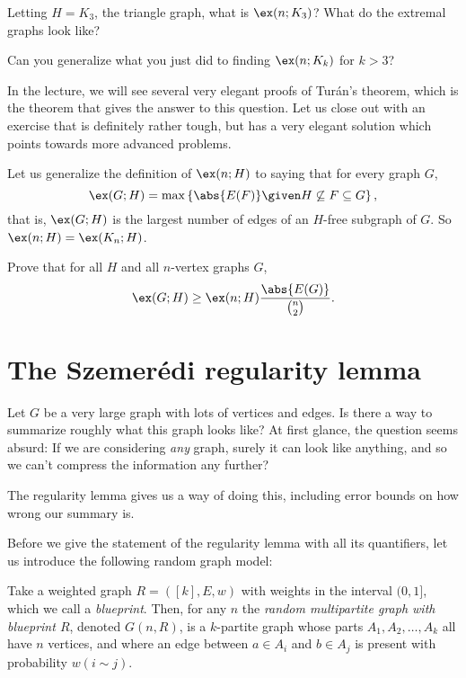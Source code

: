 \documentclass[nobib]{tufte-handout}
\begin{document}
\begin{xca}
  Letting $H = K_3$, the triangle graph, what is $\ex(n; K_3)$? What do the extremal graphs look like?
\end{xca}

\begin{xca}
  Can you generalize what you just did to finding $\ex(n; K_k)$ for $k > 3$?
\end{xca}

In the lecture, we will see several very elegant proofs of Turán's theorem, which is the theorem that gives the answer to this question. Let us close out with an exercise that is definitely rather tough, but has a very elegant solution which points towards more advanced problems.

\begin{xca}
  Let us generalize the definition of $\ex(n; H)$ to saying that for every graph $G$,
  $$\ex(G; H) = \max\left\{\abs{E(F)} \given H \not\subseteq F \subseteq G\right\},$$
  that is, $\ex(G;H)$ is the largest number of edges of an $H$-free subgraph of $G$. So $\ex(n; H) = \ex(K_n; H)$.

  Prove that for all $H$ and all $n$-vertex graphs $G$,
  $$\ex(G; H) \geq \ex(n; H) \frac{\abs{E(G)}}{\binom{n}{2}}.$$
\end{xca}

\section{The Szemerédi regularity lemma}

Let $G$ be a very large graph with lots of vertices and edges. Is there a way to summarize roughly what this graph looks like? At first glance, the question seems absurd: If we are considering \emph{any} graph, surely it can look like anything, and so we can't compress the information any further?

The regularity lemma gives us a way of doing this, including error bounds on how wrong our summary is.

Before we give the statement of the regularity lemma with all its quantifiers, let us introduce the following random graph model:

\begin{definition}
  Take a weighted graph $R = ([k], E, w)$ with weights in the interval $(0,1]$, which we call a \emph{blueprint}. Then, for any $n$ the \emph{random multipartite graph with blueprint $R$}, denoted $G(n,R)$, is a $k$-partite graph whose parts $A_1, A_2, \ldots, A_k$ all have $n$ vertices, and where an edge between $a \in A_i$ and $b \in A_j$ is present with probability $w(i \sim j)$.
\end{definition}
\end{document}
